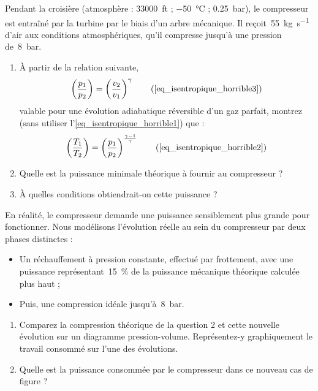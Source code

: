 	Pendant la croisière (atmosphère : \SI{33 000}{ft} ; \SI{-50}{\degreeCelsius} ; \SI{0,25}{\bar}), le compresseur est entraîné par la turbine par le biais d’un arbre mécanique. Il reçoit~\SI{55}{\kilogram\per\second} d’air aux conditions atmosphériques, qu’il compresse jusqu’à une pression de~\SI{8}{\bar}.
	
	\begin{enumerate}
		\item À partir de la relation suivante,
			\begin{equation}
				\left( \frac{p_1}{p_2} \right)	= \left( \frac{v_2}{v_1} \right)^{\gamma} \tag{\ref{eq_isentropique_horrible3}}
			\end{equation}
			valable pour une évolution adiabatique réversible d’un gaz parfait, montrez (sans utiliser l’\cref{eq_isentropique_horrible1}) que :			
			\begin{equation}
				\left( \frac{T_1}{T_2} \right)	=  \left( \frac{p_1}{p_2} \right)^{\frac{\gamma -1}{\gamma}}  \tag{\ref{eq_isentropique_horrible2}}
			\end{equation}
		\item Quelle est la puissance minimale théorique à fournir au compresseur ?
		\item À quelles conditions obtiendrait-on cette puissance ?
	\end{enumerate}
	
	En réalité, le compresseur demande une puissance sensiblement plus grande pour fonctionner. Nous modélisons l’évolution réelle au sein du compresseur par deux phases distinctes :

	\begin{itemize}
		\item Un réchauffement à pression constante, effectué par frottement, avec une puissance représentant~\SI{15}{\percent} de la puissance mécanique théorique calculée plus haut ;
		\item Puis, une compression idéale jusqu’à~\SI{8}{\bar}.
	\end{itemize}
	
	\begin{enumerate}
		\item Comparez la compression théorique de la question 2 et cette nouvelle évolution sur un diagramme pression-volume. Représentez-y graphiquement le travail consommé sur l’une des évolutions.
		\item Quelle est la puissance consommée par le compresseur dans ce nouveau cas de figure ?
	\end{enumerate}


